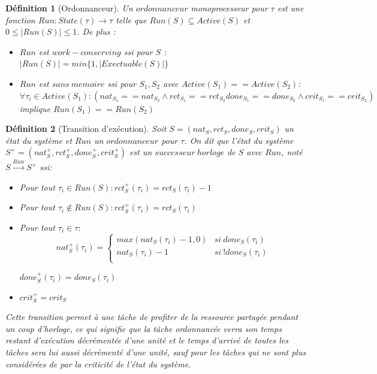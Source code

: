 \documentclass[a4paper]{report}
\theoremstyle{break}
\newtheorem{defin}{Définition}
\theoremstyle{breakplain}
\begin{document}
\begin{defin}[Ordonnanceur]
\label{run}
Un $ordonnanceur$ monoprocesseur pour $\tau$ est une fonction $Run : State(\tau) \rightarrow \tau$ telle que $Run(S) \subseteq Active(S)$ et $0 \leq |Run(S)| \leq 1$.
De plus :
\begin{itemize}
\item $Run$ est $work-conserving$ ssi pour $S$ : $ |Run(S)| = min\{1, |Exectuable(S)|\}$
\item $Run$ est $sans\ memoire$ ssi pour $S_1,S_2$ avec $Active(S_1) == Active(S_2)$:
$\forall \tau_i \in Active(S_1) : (nat_{S_1} == nat_{S_2} \wedge rct_{S_1} == rct_{S_2} done_{S_1} == done_{S_2} \wedge crit_{S_1} == crit_{S_2} )$ implique $Run(S_1) == Run(S_2)$
\end{itemize}

\end{defin}

\begin{defin}[Transition d'exécution]
\label{texec}
Soit $S = (nat_S, rct_S, done_S, crit_S)$ un état du système et $Run$ un $ordonnanceur$ pour $\tau$. On dit que l'état du système $S^+ = (nat_S^+, rct_S^+, done_S^+, crit_S^+)$ est un $successeur\ horloge$ de $S$ avec $Run$, noté $S\xrightarrow{Run}S^+$ ssi:
\begin{itemize}
\item Pour tout $\tau_i \in Run(S) : rct_S^+(\tau_i) = rct_S(\tau_i)-1$\\
\item Pour tout $\tau_i \not \in Run(S) : rct_S^+(\tau_i) = rct_S(\tau_i)$\\
\item Pour tout $\tau_i \in \tau :$
$$ nat_S^+(\tau_i) = \left\{
    \begin{array}{ll}
        max(nat_S(\tau_i)-1, 0) & si\ done_S(\tau_i) \\
        nat_S(\tau_i)-1 & si\ !done_S(\tau_i) \\
    \end{array}
\right.
$$
\begin{center}
$done_{S}^{+}(\tau_i) = done_{S}(\tau_i)$

\end{center}
\item $crit_{S}^{+} = crit_{S}$

\end{itemize}
Cette transition permet à une tâche de profiter de la ressource partagée pendant un coup d'horloge, ce qui signifie que la tâche ordonnancée verra son temps restant d'exécution décrémentée d'une unité et le temps d'arrivé de toutes les tâches sera lui aussi décrémenté d'une unité, sauf pour les tâches qui ne sont plus considérées de par la criticité de l'état du système.
\end{defin}
\end{document}
